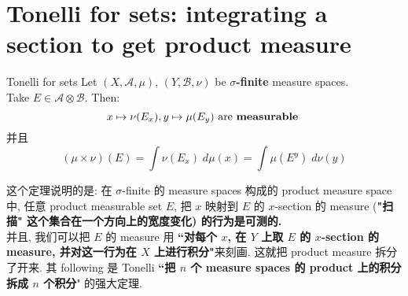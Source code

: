 \documentclass[lang=cn,11pt]{elegantbook}
\begin{document}
\section{Tonelli for sets: integrating a section to get product measure}
\begin{theorem}{Tonelli for sets}
Let $(X,\mathcal{A}, \mu)$, $(Y, \mathcal{B}, \nu)$ be\textbf{ $\sigma$-finite} measure spaces.\\
Take $E \in \mathcal{A} \otimes \mathcal{B}$. Then:  \[
x \mapsto \nu(E_x), y \mapsto \mu(E_y) \text{ are \textbf{measurable} }
\] 并且 \[
(\mu \times \nu)(E) = \int \nu(E_x)  \; d\mu(x) = \int \mu(E^y) \; d \nu(y)
\]
\end{theorem}
\begin{remark}
这个定理说明的是: 在 $\sigma$-finite 的 measure spaces 构成的 product measure space 中, 任意 product measurable set $E$, 把 $x$ 映射到 $E$ 的 $x$-section 的 measure (\textbf{"扫描" 这个集合在一个方向上的宽度变化) 的行为是可测的.}\\
并且, 我们可以把 $E$ 的 measure 用 \textbf{``对每个 $x$, 在 $Y$ 上取 $E$ 的 $x$-section 的 measure, 并对这一行为在 $X$ 上进行积分"}来刻画. 这就把 product measure 拆分了开来. 其 following 是 Tonelli \textbf{``把 $n$ 个 measure spaces 的 product 上的积分拆成 $n$ 个积分}" 的强大定理.
\end{remark}
\end{document}
